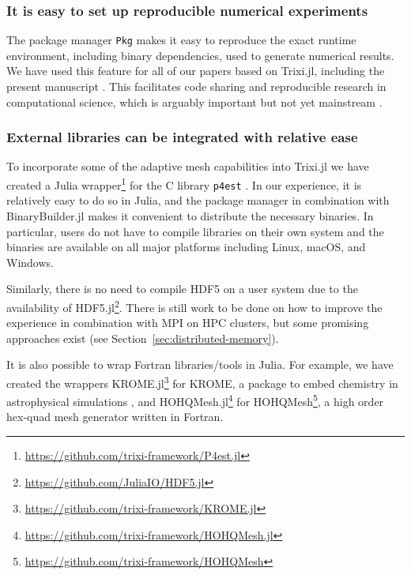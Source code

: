 \documentclass[hidelinks]{juliacon} %
\newcommand{\trixi}{Trixi.jl\xspace}
\begin{document}
\subsubsection{It is easy to set up reproducible numerical experiments}

The package manager \lstinline{Pkg} makes it easy to reproduce the exact runtime environment, including
binary dependencies, used to generate numerical results. We have used this feature for all of our papers based on
\trixi \cite{schlottkelakemper2021purely, ranocha2021preventing}, including the present manuscript
\cite{ranocha2021adaptiveRepro}.
This facilitates code sharing and reproducible research in computational science,
which is arguably important but not yet mainstream \cite{barnes2010publish,
donoho2010invitation, leveque2013top}.

\subsubsection{External libraries can be integrated with relative ease}
\label{sec:external-libraries}

To incorporate some of the adaptive mesh capabilities into \trixi
we have created a Julia wrapper\footnote{\url{https://github.com/trixi-framework/P4est.jl}}
for the C library \texttt{p4est} \cite{burstedde2011p4est}. In our experience,
it is relatively easy to do so in Julia, and the package manager in combination
with BinaryBuilder.jl makes it convenient to distribute the necessary binaries.
In particular, users do not have to compile libraries on their own system
and the binaries are available on all major platforms including Linux, macOS,
and Windows.

Similarly, there is no need to compile HDF5 on a user system due to the
availability of HDF5.jl\footnote{\url{https://github.com/JuliaIO/HDF5.jl}}.
There is still work to be done on how to improve the experience in combination
with MPI on HPC clusters, but some promising
approaches exist (see Section~\ref{sec:distributed-memory}).

It is also possible to wrap Fortran libraries/tools in Julia. For example, we
have created the wrappers KROME.jl\footnote{\url{https://github.com/trixi-framework/KROME.jl}}
for KROME, a package to embed chemistry in astrophysical simulations
\cite{grassi2014krome}, and HOHQMesh.jl\footnote{\url{https://github.com/trixi-framework/HOHQMesh.jl}}
for HOHQMesh\footnote{\url{https://github.com/trixi-framework/HOHQMesh}}, a high order
hex-quad mesh generator written in Fortran.
\end{document}
